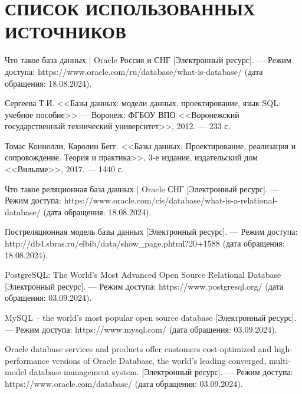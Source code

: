 \section*{СПИСОК ИСПОЛЬЗОВАННЫХ ИСТОЧНИКОВ}

\begingroup
\renewcommand{\section}[2]{}
\begin{thebibliography}{}
	
		Что такое база данных | Oracle Россия и СНГ [Электронный ресурс]. --- Режим доступа: 
		https://www.oracle.com/ru/database/what-is-database/
		(дата обращения: 18.08.2024).
			
		Сергеева Т.И.
		<<Базы данных: модели данных, проектирование, язык SQL: учебное пособие>> --- Воронеж: ФГБОУ ВПО <<Воронежский государственный технический университет>>, 2012. --- 233 с.

		Томас Коннолли, Каролин Бегг.
		<<Базы данных: Проектирование, реализация
            и сопровождение. Теория и практика>>, 3-е издание, издательский дом <<Вильяме>>, 2017. --- 1440 с.

		Что такое реляционная база данных | Oracle СНГ [Электронный ресурс]. --- Режим доступа: 
		https://www.oracle.com/cis/database/what-is-a-relational-database/
		(дата обращения: 18.08.2024).

		Постреляционная модель базы данных [Электронный ресурс]. --- Режим доступа: 
		http://db4.sbras.ru/elbib/data/show\_page.phtml?20+1588
		(дата обращения: 18.08.2024).

		PostgreSQL: The World's Most Advanced Open Source Relational Database  [Электронный ресурс]. --- Режим доступа: https://www.postgresql.org/ (дата обращения: 03.09.2024).

		MySQL -- the world's most popular open source database   [Электронный ресурс]. --- Режим доступа: 	https://www.mysql.com/ (дата обращения: 03.09.2024).

		Oracle database services and products offer customers cost-optimized and high-performance versions of Oracle Database, the world's leading converged, multi-model database management system. [Электронный ресурс]. --- Режим доступа: https://www.oracle.com/database/ (дата обращения: 03.09.2024).


\end{thebibliography}
